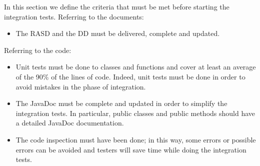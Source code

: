 In this section we define the criteria that must be met before starting the integration tests.
Referring to the documents:
\begin{itemize}
    \item The RASD and the DD must be delivered, complete and updated. 
\end{itemize}

Referring to the code:
\begin{itemize}
    \item Unit tests must be done to classes and functions and cover at least an average of the 90\% of the lines of code. Indeed, unit tests must be done in order to avoid mistakes in the phase of integration.
    \item The JavaDoc must be complete and updated in order to simplify the integration tests. In particular, public classes and public methods should have a detailed JavaDoc documentation. 
    \item The code inspection must have been done; in this way, some errors or possible errors can be avoided and testers will save time while doing the integration tests.
\end{itemize}